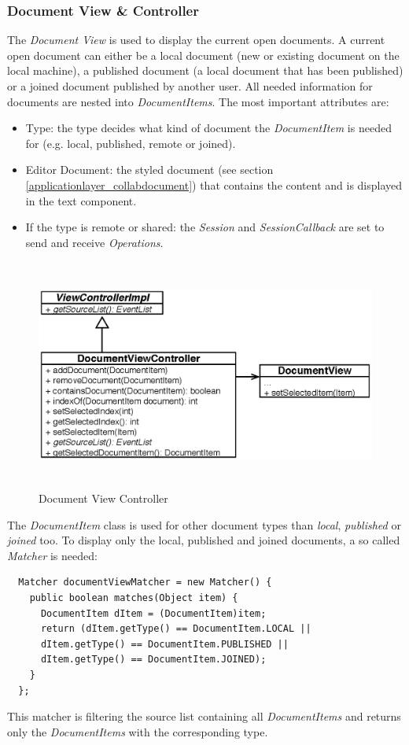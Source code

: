 \subsubsection{Document View \& Controller}
The \textit{Document View} is used to display the current open documents. A current open document can either be a local document (new or existing document on the local machine), a published document (a local document that has been published) or a joined document published by another user. All needed information for documents are nested into \textit{DocumentItems}. The most important attributes are:
\begin{itemize}
\item Type: the type decides what kind of document the \textit{DocumentItem} is needed for (e.g. local, published, remote or joined).
\item Editor Document: the styled document (see section \ref{applicationlayer_collabdocument}) that contains the content and is displayed in the text component.
\item If the type is remote or shared: the \textit{Session} and \textit{SessionCallback} are set to send and receive \textit{Operations}.
\end{itemize}
\begin{figure}[H]
\begin{center}
  \includegraphics[height=2.99in, width=5.62in]{../images/finalreport/application_documentview.eps}
\caption{Document View Controller}
\label{application_documentview}
\end{center}
\end{figure}
The \textit{DocumentItem} class is used for other document types than \textit{local}, \textit{published} or \textit{joined} too. To display only the local, published and joined documents, a so called \textit{Matcher} is needed:
\begin{verbatim}
  Matcher documentViewMatcher = new Matcher() {
    public boolean matches(Object item) {
      DocumentItem dItem = (DocumentItem)item;
      return (dItem.getType() == DocumentItem.LOCAL ||
      dItem.getType() == DocumentItem.PUBLISHED ||
      dItem.getType() == DocumentItem.JOINED);
    }
  };
\end{verbatim}
This matcher is filtering the source list containing all \textit{DocumentItems} and returns only the \textit{DocumentItems} with the corresponding type.


